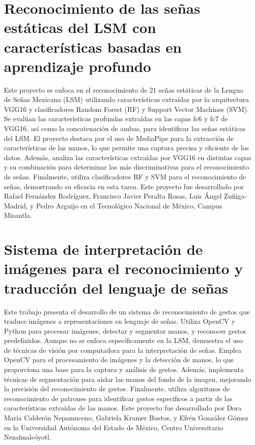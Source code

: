 \section{Reconocimiento de las señas estáticas del LSM con características basadas en aprendizaje profundo \cite{ref23}}

Este proyecto se enfoca en el reconocimiento de 21 señas estáticas de la Lengua de Señas Mexicana (LSM) utilizando características extraídas por la arquitectura VGG16 y clasificadores Random Forest (RF) y Support Vector Machines (SVM). Se evalúan las características profundas extraídas en las capas fc6 y fc7 de VGG16, así como la concatenación de ambas, para identificar las señas estáticas del LSM. El proyecto destaca por el uso de MediaPipe para la extracción de características de las manos, lo que permite una captura precisa y eficiente de los datos. Además, analiza las características extraídas por VGG16 en distintas capas y su combinación para determinar las más discriminativas para el reconocimiento de señas. Finalmente, utiliza clasificadores RF y SVM para el reconocimiento de señas, demostrando su eficacia en esta tarea. Este proyecto fue desarrollado por Rafael Fernández Rodríguez, Francisco Javier Peralta Rosas, Luis Ángel Zuñiga-Madrid, y Pedro Arguijo en el Tecnológico Nacional de México, Campus Misantla.

\section{Sistema de interpretación de imágenes para el reconocimiento y traducción del lenguaje de señas \cite{ref24}}

Este trabajo presenta el desarrollo de un sistema de reconocimiento de gestos que traduce imágenes a representaciones en lenguaje de señas. Utiliza OpenCV y Python para procesar imágenes, detectar y segmentar manos, y reconocer gestos predefinidos. Aunque no se enfoca específicamente en la LSM, demuestra el uso de técnicas de visión por computadora para la interpretación de señas. Emplea OpenCV para el procesamiento de imágenes y la detección de manos, lo que proporciona una base para la captura y análisis de gestos. Además, implementa técnicas de segmentación para aislar las manos del fondo de la imagen, mejorando la precisión del reconocimiento de gestos. Finalmente, utiliza algoritmos de reconocimiento de patrones para identificar gestos específicos a partir de las características extraídas de las manos.  Este proyecto fue desarrollado por Dora María Calderón Nepamuceno, Gabriela Kramer Bustos, y Efrén González Gómez en la Universidad Autónoma del Estado de México, Centro Universitario Nezahualcóyotl.

